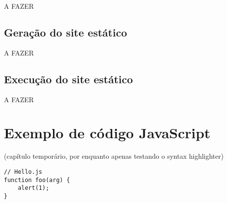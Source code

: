 \documentclass[ppginf, pep]{esinucpel}
\begin{document}
A FAZER

\section{Geração do site estático}

A FAZER

\section{Execução do site estático}

A FAZER

\chapter{Exemplo de código JavaScript}

(capítulo temporário, por enquanto apenas testando o syntax highlighter)

\begin{lstlisting}
// Hello.js
function foo(arg) {
	alert(1);
}
\end{lstlisting}

% 
\end{document}
